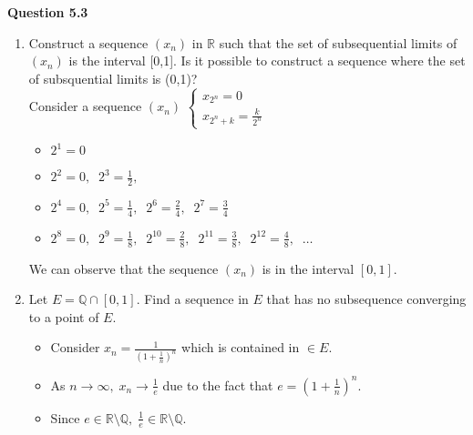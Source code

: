 \documentclass[12pt]{article}
\begin{document}
\newpage
\textbf{Question 5.3}
\begin{enumerate}[label=(\roman*)]
    \item Construct a sequence $(x_n)$ in $\mathbb{R}$ such that the set of subsequential limits of $(x_n)$ is the interval [0,1]. Is it possible to construct a sequence where the set of subsquential limits is (0,1)?\\
    
    Consider a sequence $(x_n)$
    $\begin{cases}
        x_{2^n} = 0\\
        x_{2^n+k} = \frac{k}{2^n}
    \end{cases}$
    \begin{itemize}
        \item $2^1 = 0$
        \item $2^2 = 0,\;\;2^3 = \frac{1}{2},\;$
        \item $2^4 = 0,\;\;2^5 = \frac{1}{4},\;\;2^6 = \frac{2}{4},\;\;2^7 = \frac{3}{4}$
        \item $2^8 = 0,\;\;2^9 = \frac{1}{8},\;\;2^{10} = \frac{2}{8},\;\;2^{11} =              \frac{3}{8},\;\;2^{12}=\frac{4}{8},\;\;\ldots$
    \end{itemize}
    We can observe that the sequence $(x_n)$ is in the interval $[0,1]$.
    
    \vspace{1.5\baselineskip}
    \item Let $E = \mathbb{Q} \cap [0,1]$. Find a sequence in $E$ that has no subsequence converging to a point of $E$. 
    \begin{itemize}
        \item Consider $x_n = \frac{1}{\left(1+\frac{1}{n}\right)^n}$ which is contained in $\in E$.
        
        \item As $n\to\infty,\; x_n\to \frac{1}{e}$ due to the fact that $e=\left(1+\frac{1}{n}\right)^n$.
        
        \item Since $e\in\mathbb{R}\setminus\mathbb{Q},\;\frac{1}{e}\in\mathbb{R}\setminus\mathbb{Q}$.
    \end{itemize}
\end{enumerate}
\end{document}
